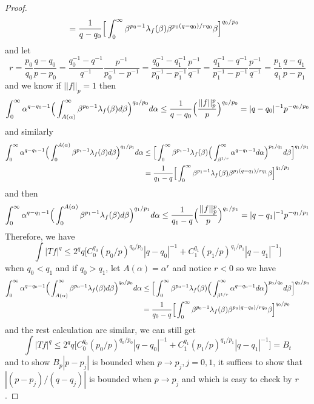\begin{proof}
\[\begin{aligned}
    & = \dfrac{1}{q-q_0}\Big[\int_0^{\infty}\beta^{p_0-1}\lambda_{f}(\beta)\beta^{p_0(q-q_0)/rq_0}\beta\Big]^{q_0/p_0}
    \end{aligned}
    \]
    and let \[r = \dfrac{p_0}{q_0}\dfrac{q-q_0}{p-p_0} = \dfrac{q_0^{-1}-q^{-1}}{q^{-1}}\dfrac{p^{-1}}{p_0^{-1}-p^{-1}} = \dfrac{q_0^{-1}-q_1^{-1}}{p_0^{-1}-p_1^{-1}}\dfrac{p^{-1}}{q^{-1}} = \dfrac{q_1^{-1}-{q^{-1}}}{p_1^{-1}-p^{-1}}\dfrac{p^{-1}}{q^{-1}} = \dfrac{p_1}{q_1}\dfrac{q-q_1}{p-p_1}\]
    and we know if $||f||_p = 1$ then
    \[
    \int_0^{\infty}\alpha^{q-q_0-1}\Big(\int_{A(\alpha)}^{\infty}\beta^{p_0-1}\lambda_{f}(\beta)d\beta\Big)^{q_0/p_0}d\alpha \leq  \dfrac{1}{q-q_0}\Big(\dfrac{||f||_p^p}{p}\Big)^{q_0/p_0} = |q-q_0|^{-1}p^{-q_0/p_0}
    \]
    and similarly
    \[
    \begin{aligned}
    \int_0^{\infty}\alpha^{q-q_1-1}\Big(\int_0^{A(\alpha)}\beta^{p_1-1}\lambda_{f}(\beta)d\beta\Big)^{q_1/p_1}d\alpha &\leq \Big[\int_0^{\infty}\beta^{p_1-1}\lambda_{f}(\beta)\Big(\int_{\beta^{1/r}}^{\infty} \alpha^{q-q_1-1}d\alpha\Big)^{p_1/q_1}d\beta\Big]^{q_1/p_1} \\
    & = \dfrac{1}{q_1-q}\Big[\int_0^{\infty}\beta^{p_1-1}\lambda_{f}(\beta)\beta^{p_1(q-q_1)/rq_1}\beta\Big]^{q_1/p_1}
    \end{aligned}
    \]
    and then
    \[
    \int_0^{\infty}\alpha^{q-q_1-1}\Big(\int_0^{A(\alpha)}\beta^{p_1-1}\lambda_{f}(\beta)d\beta\Big)^{q_1/p_1}d\alpha \leq  \dfrac{1}{q_1-q}\Big(\dfrac{||f||_p^p}{p}\Big)^{q_1/p_1} = |q-q_1|^{-1}p^{-q_1/p_1}
    \]
    Therefore, we have
    \[
    \int |Tf|^q \leq 2^qq\Big[C_0^{q_0}(p_0/p)^{q_0/p_0}|q-q_0|^{-1}+C_1^{q_1}(p_1/p)^{q_1/p_1}|q-q_1|^{-1} \Big]
    \]
    when $q_0 < q_1$ and if $q_0 > q_1$, let $A(\alpha) = \alpha^{r}$ and notice $r<0$ so we have
    \[
    \begin{aligned}
    \int_0^{\infty}\alpha^{q-q_0-1}\Big(\int_{A(\alpha)}^{\infty}\beta^{p_0-1}\lambda_{f}(\beta)d\beta\Big)^{q_0/p_0}d\alpha &\leq \Big[\int_0^{\infty}\beta^{p_0-1}\lambda_{f}(\beta)\Big(\int_{\beta^{1/r}}^{\infty} \alpha^{q-q_0-1}d\alpha\Big)^{p_0/q_0}d\beta\Big]^{q_0/p_0} \\
    & = \dfrac{1}{q_0-q}\Big[\int_0^{\infty}\beta^{p_0-1}\lambda_{f}(\beta)\beta^{p_0(q-q_0)/rq_0}\beta\Big]^{q_0/p_0}
    \end{aligned}
    \]
    and the rest calculation are similar, we can still get
    \[
    \int |Tf|^q \leq 2^qq\Big[C_0^{q_0}(p_0/p)^{q_0/p_0}|q-q_0|^{-1}+C_1^{q_1}(p_1/p)^{q_1/p_1}|q-q_1|^{-1} \Big] = B_t
    \]
    and to show $B_p|p-p_j|$ is bounded when $p\to p_j, j = 0,1$, it suffices to show that $|(p-p_j)/(q-q_j)|$ is bounded when $p\to p_j$ and which is easy to check by $r$.\par

\end{proof}
